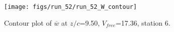 \begin{figure}[H]
\centering
\texttt{[image: figs/run\_52/run\_52\_W\_contour]}
\caption{Contour plot of $\overline{w}$ at $z/c$=9.50, $V_{free}$=17.36, station 6.}
\end{figure}


